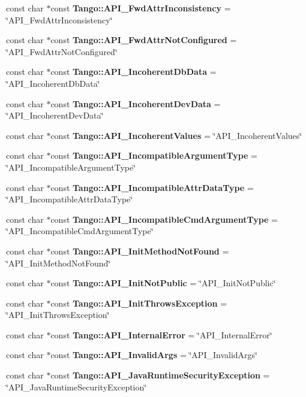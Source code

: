 \begin{DoxyCompactItemize}
const char $\ast$const {\bf Tango\-::\-A\-P\-I\-\_\-\-Fwd\-Attr\-Inconsistency} = \char`\"{}A\-P\-I\-\_\-\-Fwd\-Attr\-Inconsistency\char`\"{}
\item 
const char $\ast$const {\bf Tango\-::\-A\-P\-I\-\_\-\-Fwd\-Attr\-Not\-Configured} = \char`\"{}A\-P\-I\-\_\-\-Fwd\-Attr\-Not\-Configured\char`\"{}
\item 
const char $\ast$const {\bf Tango\-::\-A\-P\-I\-\_\-\-Incoherent\-Db\-Data} = \char`\"{}A\-P\-I\-\_\-\-Incoherent\-Db\-Data\char`\"{}
\item 
const char $\ast$const {\bf Tango\-::\-A\-P\-I\-\_\-\-Incoherent\-Dev\-Data} = \char`\"{}A\-P\-I\-\_\-\-Incoherent\-Dev\-Data\char`\"{}
\item 
const char $\ast$const {\bf Tango\-::\-A\-P\-I\-\_\-\-Incoherent\-Values} = \char`\"{}A\-P\-I\-\_\-\-Incoherent\-Values\char`\"{}
\item 
const char $\ast$const {\bf Tango\-::\-A\-P\-I\-\_\-\-Incompatible\-Argument\-Type} = \char`\"{}A\-P\-I\-\_\-\-Incompatible\-Argument\-Type\char`\"{}
\item 
const char $\ast$const {\bf Tango\-::\-A\-P\-I\-\_\-\-Incompatible\-Attr\-Data\-Type} = \char`\"{}A\-P\-I\-\_\-\-Incompatible\-Attr\-Data\-Type\char`\"{}
\item 
const char $\ast$const {\bf Tango\-::\-A\-P\-I\-\_\-\-Incompatible\-Cmd\-Argument\-Type} = \char`\"{}A\-P\-I\-\_\-\-Incompatible\-Cmd\-Argument\-Type\char`\"{}
\item 
const char $\ast$const {\bf Tango\-::\-A\-P\-I\-\_\-\-Init\-Method\-Not\-Found} = \char`\"{}A\-P\-I\-\_\-\-Init\-Method\-Not\-Found\char`\"{}
\item 
const char $\ast$const {\bf Tango\-::\-A\-P\-I\-\_\-\-Init\-Not\-Public} = \char`\"{}A\-P\-I\-\_\-\-Init\-Not\-Public\char`\"{}
\item 
const char $\ast$const {\bf Tango\-::\-A\-P\-I\-\_\-\-Init\-Throws\-Exception} = \char`\"{}A\-P\-I\-\_\-\-Init\-Throws\-Exception\char`\"{}
\item 
const char $\ast$const {\bf Tango\-::\-A\-P\-I\-\_\-\-Internal\-Error} = \char`\"{}A\-P\-I\-\_\-\-Internal\-Error\char`\"{}
\item 
const char $\ast$const {\bf Tango\-::\-A\-P\-I\-\_\-\-Invalid\-Args} = \char`\"{}A\-P\-I\-\_\-\-Invalid\-Args\char`\"{}
\item 
const char $\ast$const {\bf Tango\-::\-A\-P\-I\-\_\-\-Java\-Runtime\-Security\-Exception} = \char`\"{}A\-P\-I\-\_\-\-Java\-Runtime\-Security\-Exception\char`\"{}
\item 

\end{DoxyCompactItemize}
